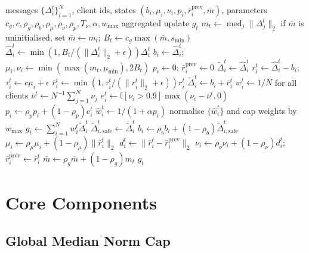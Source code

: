 \begin{algorithm}[p]
\caption{History-Residual Adaptive Clipping (HRAC)}
\label{alg:hrac}
\begin{algorithmic}[1]
\Require messages $\{\Delta_i^t\}_{i=1}^{N}$, client ids, states
$(b_i,\mu_i,\nu_i,p_i,\bar r_i^{\mathrm{prev}},\bar m)$, parameters
$c_g,c,\rho_g,\rho_b,\rho_\mu,\rho_\nu,\rho_p,T_\nu,\alpha,w_{\max}$
\Ensure aggregated update $g_t$
\State $m_t \gets \operatorname{med}_{j}\|\Delta_j^t\|_2$
\State if $\bar m$ is uninitialised, set $\bar m\gets m_t$; \quad
$B_t \gets c_g\max(\bar m,s_{\min})$
    \State $\hat{\Delta}_i^t \gets
    \min(1,B_t/(\|\Delta_i^t\|_2+\epsilon))\Delta_i^t$
        \State $b_i\gets\hat\Delta_i^t$; \quad
        $\mu_i,\nu_i\gets \min(\max(m_t,\mu_{\min}),2B_t)$
        \State $p_i\gets0$; \quad $\bar r_i^{\mathrm{prev}}\gets0$
        \State $\tilde{\Delta}_i^t\gets \hat{\Delta}_i^t$
    \Else
        \State $r_i^t\gets \hat{\Delta}_i^t-b_i$; \quad
        $\tau_i^t\gets c\mu_i+\epsilon$
        \State $\bar r_i^t\gets
        \min(1,\tau_i^t/(\|r_i^t\|_2+\epsilon))r_i^t$
        \State $\tilde{\Delta}_i^t\gets b_i+\bar r_i^t$
    \EndIf
\EndFor
{}
    \State $w_i^t\gets 1/N$ for all clients
\Else
    \State $\bar\nu^t\gets N^{-1}\sum_{j=1}^{N}\nu_j$
        \State $e_i^t\gets \mathbb{I}[\nu_i>0.9]\max(\nu_i-\bar\nu^t,0)$
        \State $p_i\gets \rho_p p_i+(1-\rho_p)e_i^t$
        \State $\hat w_i^t\gets 1/(1+\alpha p_i)$
    \EndFor
    \State normalise $\{\hat w_i^t\}$ and cap weights by $w_{\max}$
\EndIf
\State $g_t\gets \sum_{i=1}^{N} w_i^t\tilde{\Delta}_i^t$
    \State $\tilde{\Delta}_{i,\mathrm{safe}}^t\gets\tilde{\Delta}_i^t$
    \State $b_i\gets \rho_b b_i+(1-\rho_b)\tilde{\Delta}_{i,\mathrm{safe}}^t$
    \State $\mu_i\gets \rho_\mu\mu_i+(1-\rho_\mu)\|\bar r_i^t\|_2$
    \State $d_i^t\gets \|\bar r_i^t-\bar r_i^{\mathrm{prev}}\|_2$
    \State $\nu_i\gets \rho_\nu\nu_i+(1-\rho_\nu)d_i^t$; \quad
    $\bar r_i^{\mathrm{prev}}\gets \bar r_i^t$
\EndFor
\State $\bar m\gets \rho_g\bar m+(1-\rho_g)m_t$
\State \Return $g_t$
\end{algorithmic}
\end{algorithm}

\section{Core Components}

\subsection{Global Median Norm Cap}

